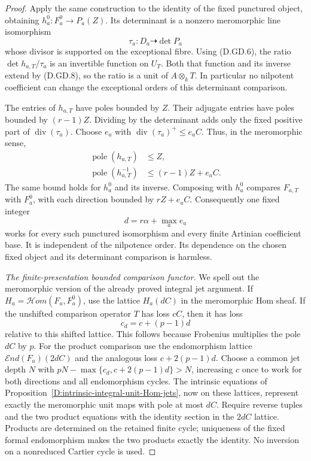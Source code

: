 \begin{proof}
Apply the same construction to the identity of the fixed
punctured object, obtaining
$h_a^0:F_a^0\to P_a(Z)$. Its determinant is a nonzero
meromorphic line isomorphism
\[
                 \tau_a:D_a\dashrightarrow\det P_a
                                                        \tag{D.GD.10}
\]
whose divisor is supported on the exceptional fibre.
Using (D.GD.6), the ratio
$\det h_{a,T}/\tau_a$ is an invertible function on $U_T$.
Both that function and its inverse extend by (D.GD.8),
so the ratio is a unit of $A\otimes_kT$. In particular
no nilpotent coefficient can change the exceptional
orders of this determinant comparison.

The entries of $h_{a,T}$ have poles bounded by $Z$.
Their adjugate entries have poles bounded by $(r-1)Z$.
Dividing by the determinant adds only the fixed positive
part of $\operatorname{div}(\tau_a)$. Choose $e_a$ with
$\operatorname{div}(\tau_a)^+\le e_aC$. Thus, in the
meromorphic sense,
\[
 \begin{split}
 \operatorname{pole}(h_{a,T})&\le Z,\\
 \operatorname{pole}(h_{a,T}^{-1})&\le(r-1)Z+e_aC.
 \end{split}                                             \tag{D.GD.11}
\]
The same bound holds for $h_a^0$ and its inverse. Composing
with $h_a^0$ compares $F_{a,T}$ with $F_a^0$, with each
direction bounded by $rZ+e_aC$. Consequently one fixed
integer
\[
                       d=r\alpha+\max_a e_a             \tag{D.GD.12}
\]
works for every such punctured isomorphism and every finite
Artinian coefficient base. It is independent of the
nilpotence order. Its dependence on the chosen fixed
object and its determinant comparison is harmless.

\emph{The finite-presentation bounded comparison functor.}
We spell out the meromorphic version of the already proved
integral jet argument. If $H_a=\mathcal Hom(F_a,F_a^0)$,
use the lattice $H_a(dC)$ in the meromorphic Hom sheaf.
If the unshifted comparison operator $T$ has loss $cC$,
then it has loss
\[
                       c_d=c+(p-1)d                    \tag{D.GD.13}
\]
relative to this shifted lattice. This follows because
Frobenius multiplies the pole $dC$ by $p$.
For the product comparison use the endomorphism lattice
$\mathcal End(F_a)(2dC)$ and the analogous loss
$c+2(p-1)d$. Choose a common jet depth $N$ with
$pN-\max\{c_d,c+2(p-1)d\}>N$, increasing $c$ once to
work for both directions and all endomorphism cycles.
The intrinsic equations of
Proposition~\ref{D:intrinsic-integral-unit-Hom-jets}, now
on these lattices, represent exactly the meromorphic
unit maps with pole at most $dC$. Require reverse tuples
and the two product equations with the identity section
in the $2dC$ lattice. Products are determined on the
retained finite cycle; uniqueness of the fixed formal
endomorphism makes the two products exactly the identity.
No inversion on a nonreduced Cartier cycle is used.


\end{proof}
